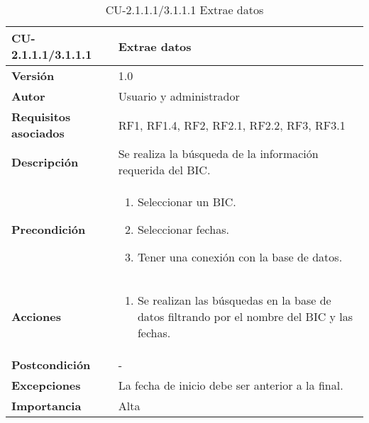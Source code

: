 \begin{table}[h!]
	\centering
	\begin{tabularx}{\linewidth}{ p{} p{} }
		\toprule
		\textbf{CU-2.1.1.1/3.1.1.1}    & \textbf{Extrae datos}\\
		\toprule
		\textbf{Versión}              & 1.0    \\
		\textbf{Autor}                & Usuario y administrador \\
		\textbf{Requisitos asociados} & RF1, RF1.4, RF2, RF2.1, RF2.2, RF3, RF3.1\\
		\textbf{Descripción}          & Se realiza la búsqueda de la información requerida del BIC.  \\
        \textbf{Precondición}         & 
        \begin{enumerate}
			\def\labelenumi{\arabic{enumi}.}
			\tightlist
                \item Seleccionar un BIC.
                \item Seleccionar fechas. 
			\item Tener una conexión con la base de datos.
            
		\end{enumerate}\\
		
		\textbf{Acciones}             &
		\begin{enumerate}
			\def\labelenumi{\arabic{enumi}.}
			\tightlist
			\item Se realizan las búsquedas en la base de datos filtrando por el nombre del BIC y las fechas.
            
		\end{enumerate}\\
		\textbf{Postcondición}        &  - \\
		\textbf{Excepciones}          &  La fecha de inicio debe ser anterior a la final.\\
		\textbf{Importancia}          & Alta \\
		\bottomrule
	\end{tabularx}
	\caption{CU-2.1.1.1/3.1.1.1 Extrae datos}
\end{table}

